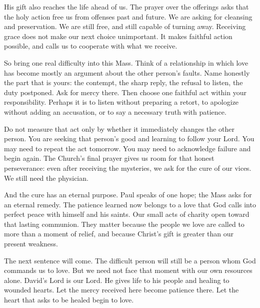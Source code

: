 His gift also reaches the life ahead of us. The prayer over the offerings asks that the holy action free us from offenses past and future. We are asking for cleansing and preservation. We are still free, and still capable of turning away. Receiving grace does not make our next choice unimportant. It makes faithful action possible, and calls us to cooperate with what we receive.

So bring one real difficulty into this Mass. Think of a relationship in which love has become mostly an argument about the other person's faults. Name honestly the part that is yours: the contempt, the sharp reply, the refusal to listen, the duty postponed. Ask for mercy there. Then choose one faithful act within your responsibility. Perhaps it is to listen without preparing a retort, to apologize without adding an accusation, or to say a necessary truth with patience.

Do not measure that act only by whether it immediately changes the other person. You are seeking that person's good and learning to follow your Lord. You may need to repeat the act tomorrow. You may need to acknowledge failure and begin again. The Church's final prayer gives us room for that honest perseverance: even after receiving the mysteries, we ask for the cure of our vices. We still need the physician.

And the cure has an eternal purpose. Paul speaks of one hope; the Mass asks for an eternal remedy. The patience learned now belongs to a love that God calls into perfect peace with himself and his saints. Our small acts of charity open toward that lasting communion. They matter because the people we love are called to more than a moment of relief, and because Christ's gift is greater than our present weakness.

The next sentence will come. The difficult person will still be a person whom God commands us to love. But we need not face that moment with our own resources alone. David's Lord is our Lord. He gives life to his people and healing to wounded hearts. Let the mercy received here become patience there. Let the heart that asks to be healed begin to love.
